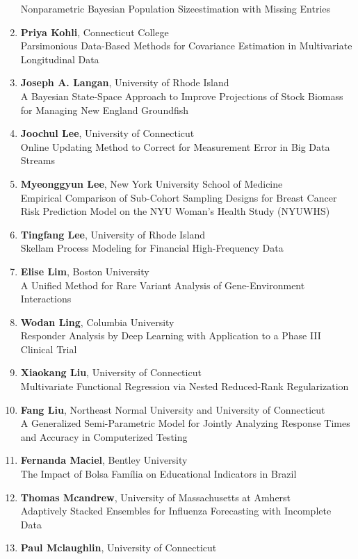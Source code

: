 \begin{enumerate}
Nonparametric Bayesian Population Sizeestimation with Missing Entries
\item \textbf{Priya Kohli}, Connecticut College \\
Parsimonious Data-Based Methods for Covariance Estimation in Multivariate Longitudinal Data
\item \textbf{Joseph A. Langan}, University of Rhode Island \\
A Bayesian State-Space Approach to Improve Projections of Stock Biomass for Managing New England Groundfish
\item \textbf{Joochul Lee}, University of Connecticut \\
Online Updating Method to Correct for Measurement Error in Big Data Streams
\item \textbf{Myeonggyun Lee}, New York University School of Medicine \\
Empirical Comparison of Sub-Cohort Sampling Designs for Breast Cancer Risk Prediction Model on the NYU Woman’s Health Study (NYUWHS)
\item \textbf{Tingfang Lee}, University of Rhode Island \\
Skellam Process Modeling for Financial High-Frequency Data
\item \textbf{Elise Lim}, Boston University \\
A Unified Method for Rare Variant Analysis of Gene-Environment Interactions
\item \textbf{Wodan Ling}, Columbia University \\
Responder Analysis by Deep Learning with Application to a Phase III Clinical Trial
\item \textbf{Xiaokang Liu}, University of Connecticut \\
Multivariate Functional Regression via Nested Reduced-Rank Regularization
\item \textbf{Fang Liu}, Northeast Normal University and University of Connecticut \\
A Generalized Semi-Parametric Model for Jointly Analyzing Response Times and Accuracy in Computerized Testing
\item \textbf{Fernanda Maciel}, Bentley University \\
The Impact of Bolsa Família on Educational Indicators in Brazil
\item \textbf{Thomas Mcandrew}, University of Massachusetts at Amherst \\
Adaptively Stacked Ensembles for Influenza Forecasting with Incomplete Data
\item \textbf{Paul Mclaughlin}, University of Connecticut \\

\end{enumerate}
